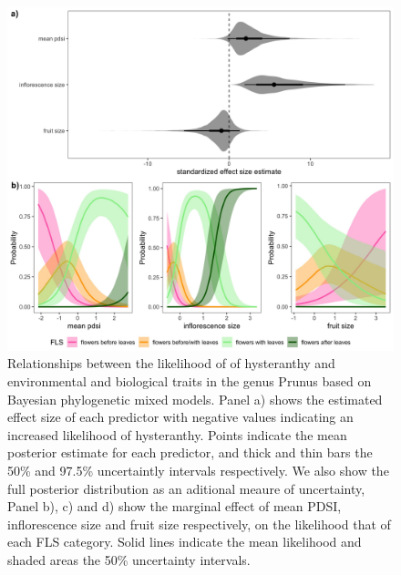 \documentclass{article}[11pt]
\begin{document}
\begin{figure}[h!]
    \centering
 \includegraphics[width=\textwidth]{..//..//Plots/fullprunus_4manu.jpeg}
    \caption{Relationships between the likelihood of of hysteranthy and environmental and biological traits in the genus Prunus based on Bayesian phylogenetic mixed models. Panel a) shows the estimated effect size of each predictor with negative values indicating an increased likelihood of hysteranthy. Points indicate the mean posterior estimate for each predictor, and thick and thin bars the 50\% and 97.5\% uncertaintly intervals respectively. We also show the full posterior distribution as an aditional meaure of uncertainty, Panel b), c) and d) show the marginal effect of mean PDSI, inflorescence size and fruit size respectively, on the likelihood that of each FLS category. Solid lines indicate the mean likelihood and shaded areas the 50\% uncertainty intervals.}
    \label{fig:genus}
\end{figure}

\end{document}
